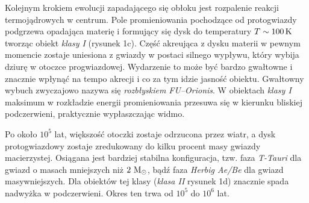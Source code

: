 Kolejnym krokiem ewolucji zapadającego się
obłoku jest rozpalenie reakcji termojądrowych w centrum. Pole promieniowania
pochodzące od protogwiazdy podgrzewa opadająca materię i formujący się dysk do
temperatury $T \sim 100\hbox{$\thinspace\textrm{K}$}$ tworząc obiekt \emph{klasy I} (rysunek 1c).  Część
akreująca z dysku materii w pewnym momencie zostaje uniesiona z gwiazdy w
postaci silnego wypływu, który wybija dziurę w otoczce progwiazdowej. Wydarzenie
to może być bardzo gwałtowne i znacznie wpłynąć na tempo akrecji i co za tym
idzie jasność obiektu. Gwałtowny wybuch zwyczajowo nazywa się \emph{rozbłyskiem
FU--Orionis}.  W obiektach \emph{klasy I} maksimum w rozkładzie energii
promieniowania przesuwa się w kierunku bliskiej podczerwieni, praktycznie
wypłaszczając widmo.  \par Po około $10^5$ lat, większość otoczki zostaje
odrzucona przez wiatr, a dysk protogwiazdowy zostaje zredukowany do kilku
procent masy gwiazdy macierzystej.  Osiągana jest bardziej stabilna
konfiguracja, tzw. faza \emph{T-Tauri} dla gwiazd o masach mniejszych niż
$2\thinspace\hbox{$\mathrm{\thinspace M_{\odot}}$}$, bądź faza \emph{Herbig Ae/Be} dla gwiazd masywniejszych. Dla
obiektów tej klasy (\emph{klasa II} rysunek 1d) znacznie spada nadwyżka w
podczerwieni. Okres ten trwa od $10^5$ do $10^6$ lat.


